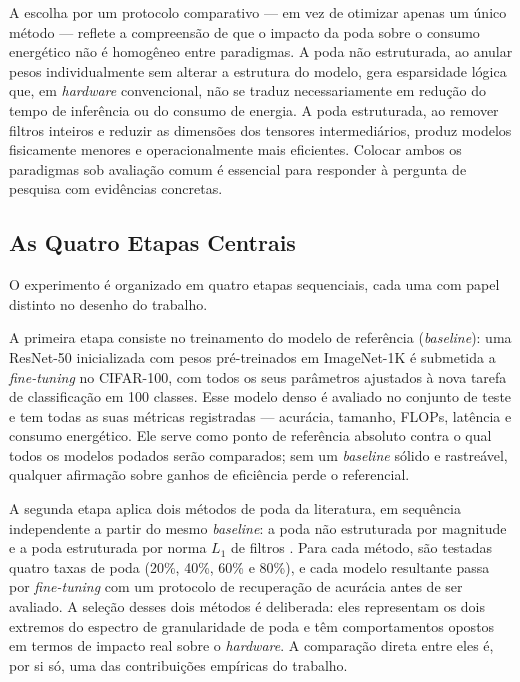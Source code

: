 A escolha por um protocolo comparativo --- em vez de otimizar apenas um único método --- reflete a compreensão de que o impacto da poda sobre o consumo energético não é homogêneo entre paradigmas. A poda não estruturada, ao anular pesos individualmente sem alterar a estrutura do modelo, gera esparsidade lógica que, em \textit{hardware} convencional, não se traduz necessariamente em redução do tempo de inferência ou do consumo de energia. A poda estruturada, ao remover filtros inteiros e reduzir as dimensões dos tensores intermediários, produz modelos fisicamente menores e operacionalmente mais eficientes. Colocar ambos os paradigmas sob avaliação comum é essencial para responder à pergunta de pesquisa com evidências concretas.

\subsection{As Quatro Etapas Centrais}\label{subsec:quatro_etapas}

O experimento é organizado em quatro etapas sequenciais, cada uma com papel distinto no desenho do trabalho.

A primeira etapa consiste no treinamento do modelo de referência (\textit{baseline}): uma ResNet-50 inicializada com pesos pré-treinados em ImageNet-1K é submetida a \textit{fine-tuning} no CIFAR-100, com todos os seus parâmetros ajustados à nova tarefa de classificação em 100 classes. Esse modelo denso é avaliado no conjunto de teste e tem todas as suas métricas registradas --- acurácia, tamanho, FLOPs, latência e consumo energético. Ele serve como ponto de referência absoluto contra o qual todos os modelos podados serão comparados; sem um \textit{baseline} sólido e rastreável, qualquer afirmação sobre ganhos de eficiência perde o referencial.

A segunda etapa aplica dois métodos de poda da literatura, em sequência independente a partir do mesmo \textit{baseline}: a poda não estruturada por magnitude \cite{Han2015} e a poda estruturada por norma $L_1$ de filtros \cite{Li2017}. Para cada método, são testadas quatro taxas de poda (20\%, 40\%, 60\% e 80\%), e cada modelo resultante passa por \textit{fine-tuning} com um protocolo de recuperação de acurácia antes de ser avaliado. A seleção desses dois métodos é deliberada: eles representam os dois extremos do espectro de granularidade de poda e têm comportamentos opostos em termos de impacto real sobre o \textit{hardware}. A comparação direta entre eles é, por si só, uma das contribuições empíricas do trabalho.

